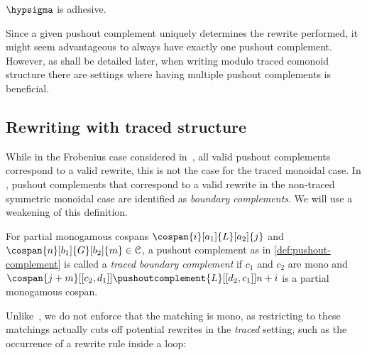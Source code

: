 \begin{proposition}
    \(\hypsigma\) is adhesive.
\end{proposition}

Since a given pushout complement uniquely determines the rewrite performed, it
might seem advantageous to always have exactly one pushout complement.
However, as shall be detailed later, when writing modulo traced comonoid
structure there are settings where having multiple pushout complements is
beneficial.

\subsection{Rewriting with traced structure}

While in the Frobenius case considered in~\cite{bonchi2022string}, all valid
pushout complements correspond to a valid rewrite, this is not the case for the
traced monoidal case.
In \cite{bonchi2022stringa}, pushout complements that correspond to a valid
rewrite in the non-traced symmetric monoidal case are identified as
\emph{boundary complements}.
We will use a weakening of this definition.

\begin{definition}
    \label{def:traced-boundary-complement}
    For partial monogamous cospans \(
        \cospan{i}[a_1]{L}[a_2]{j}
    \) and \(
        \cospan{n}[b_1]{G}[b_2]{m} \in \mathcal{C}
    \), a pushout complement as in \cref{def:pushout-complement} is called a
    \emph{traced boundary complement} if \(c_1\) and \(c_2\) are mono and \(
        \cospan{j+m}[[c_2,d_1]]{\pushoutcomplement{L}}[[d_2,c_1]]{{n+i}}
    \) is a partial monogamous cospan.
\end{definition}

Unlike~\cite{bonchi2022stringa}, we do not enforce that the matching is mono,
as restricting to these matchings actually cuts off potential rewrites in the
\emph{traced} setting, such as the occurrence of a rewrite rule inside a loop:
\begin{center}
\end{center}


